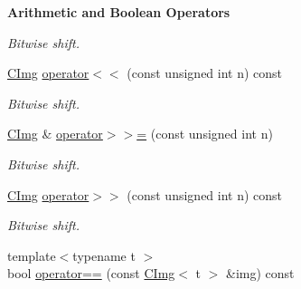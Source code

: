 \begin{Indent}{\bf Arithmetic and Boolean Operators}
\begin{DoxyCompactItemize}
\begin{DoxyCompactList}\small\item\em Bitwise shift. \item\end{DoxyCompactList}\item 
\hypertarget{structcimg__library_1_1_c_img_a9e8c9b50cae2630eae032a83701d97ee}{
\hyperlink{structcimg__library_1_1_c_img}{CImg} \hyperlink{structcimg__library_1_1_c_img_a9e8c9b50cae2630eae032a83701d97ee}{operator$<$$<$} (const unsigned int n) const }
\label{structcimg__library_1_1_c_img_a9e8c9b50cae2630eae032a83701d97ee}

\begin{DoxyCompactList}\small\item\em Bitwise shift. \item\end{DoxyCompactList}\item 
\hypertarget{structcimg__library_1_1_c_img_ad96640cd39cbff8794f1b0428de55221}{
\hyperlink{structcimg__library_1_1_c_img}{CImg} \& \hyperlink{structcimg__library_1_1_c_img_ad96640cd39cbff8794f1b0428de55221}{operator$>$$>$=} (const unsigned int n)}
\label{structcimg__library_1_1_c_img_ad96640cd39cbff8794f1b0428de55221}

\begin{DoxyCompactList}\small\item\em Bitwise shift. \item\end{DoxyCompactList}\item 
\hypertarget{structcimg__library_1_1_c_img_af1e8abcda51fe611c586d556bf639d0f}{
\hyperlink{structcimg__library_1_1_c_img}{CImg} \hyperlink{structcimg__library_1_1_c_img_af1e8abcda51fe611c586d556bf639d0f}{operator$>$$>$} (const unsigned int n) const }
\label{structcimg__library_1_1_c_img_af1e8abcda51fe611c586d556bf639d0f}

\begin{DoxyCompactList}\small\item\em Bitwise shift. \item\end{DoxyCompactList}\item 
\hypertarget{structcimg__library_1_1_c_img_aea7cfd6473a1ccee5232957deac28ef7}{
{\footnotesize template$<$typename t $>$ }\\bool \hyperlink{structcimg__library_1_1_c_img_aea7cfd6473a1ccee5232957deac28ef7}{operator==} (const \hyperlink{structcimg__library_1_1_c_img}{CImg}$<$ t $>$ \&img) const }
\label{structcimg__library_1_1_c_img_aea7cfd6473a1ccee5232957deac28ef7}


\end{DoxyCompactItemize}
\end{Indent}
